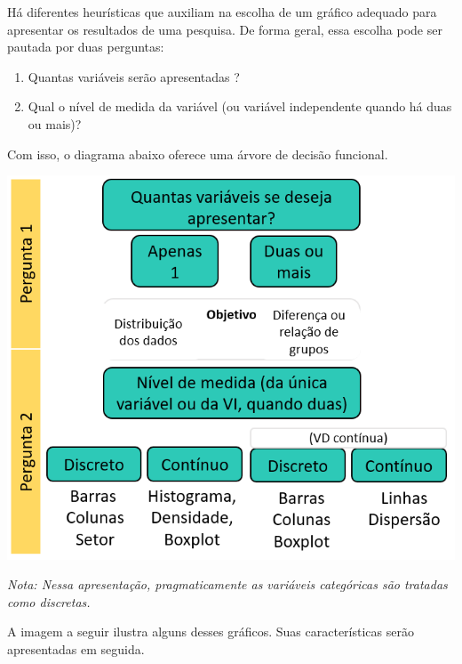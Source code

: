 \documentclass[
]{book}
\providecommand{\tightlist}{%
  \setlength{\itemsep}{0pt}\setlength{\parskip}{0pt}}
\begin{document}
Há diferentes heurísticas que auxiliam na escolha de um gráfico adequado
para apresentar os resultados de uma pesquisa. De forma geral, essa
escolha pode ser pautada por duas perguntas:

\begin{enumerate}
\def\labelenumi{\arabic{enumi}.}
\tightlist
\item
  Quantas variáveis serão apresentadas ?\\
\item
  Qual o nível de medida da variável (ou variável independente quando há
  duas ou mais)?
\end{enumerate}

Com isso, o diagrama abaixo oferece uma árvore de decisão funcional.

\includegraphics{./img/cap_como_fazer_graficos.png}

\emph{Nota: Nessa apresentação, pragmaticamente as variáveis categóricas
são tratadas como discretas.}

A imagem a seguir ilustra alguns desses gráficos. Suas características
serão apresentadas em seguida.
\end{document}
